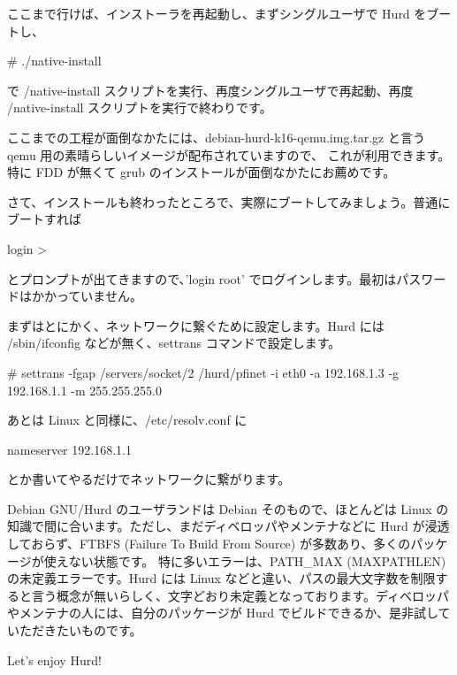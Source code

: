 \documentclass[mingoth,a4paper]{jsarticle}
\begin{document}
ここまで行けば、インストーラを再起動し、まずシングルユーザで Hurd をブートし、
\begin{commandline}
# ./native-install
\end{commandline}
で /native-install スクリプトを実行、再度シングルユーザで再起動、再度 /native-install スクリプトを実行で終わりです。

ここまでの工程が面倒なかたには、debian-hurd-k16-qemu.img.tar.gz と言う qemu 用の素晴らしいイメージが配布されていますので、
これが利用できます。特に FDD が無くて grub のインストールが面倒なかたにお薦めです。
さて、インストールも終わったところで、実際にブートしてみましょう。普通にブートすれば
\begin{commandline}
login >
\end{commandline}
とプロンプトが出てきますので、'login root' でログインします。最初はパスワードはかかっていません。

まずはとにかく、ネットワークに繋ぐために設定します。Hurd には /sbin/ifconfig などが無く、settrans コマンドで設定します。
\begin{commandline}
# settrans -fgap /servers/socket/2 /hurd/pfinet -i eth0 -a 192.168.1.3 -g 192.168.1.1 -m 255.255.255.0
\end{commandline}
あとは Linux と同様に、/etc/resolv.conf に
\begin{commandline}
nameserver 192.168.1.1
\end{commandline}
とか書いてやるだけでネットワークに繋がります。

Debian GNU/Hurd のユーザランドは Debian そのもので、ほとんどは Linux の知識で間に合います。ただし、まだディベロッパやメンテナなどに Hurd が浸透しておらず、FTBFS (Failure To Build From Source) が多数あり、多くのパッケージが使えない状態です。
特に多いエラーは、PATH\_{}MAX (MAXPATHLEN) の未定義エラーです。Hurd には Linux などと違い、パスの最大文字数を制限すると言う概念が無いらしく、文字どおり未定義となっております。ディベロッパやメンテナの人には、自分のパッケージが Hurd でビルドできるか、是非試していただきたいものです。

Let's enjoy Hurd!

\clearpage
\end{document}
